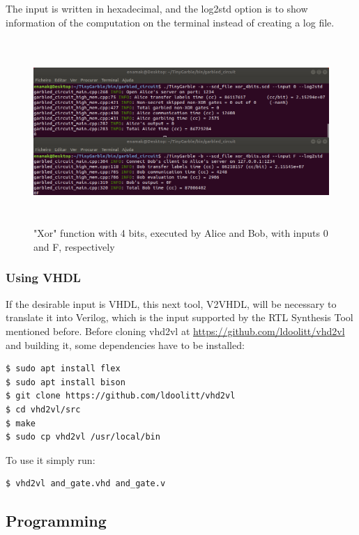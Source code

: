 \begin{refsection}
The input is written in hexadecimal, and the log2std option is to show information of the computation on the terminal instead of creating a log file.

\begin{figure}[H]
	\centering
	\includegraphics[width=1\textwidth, height=7cm]{./sdf/tiny_garble/figures/tinygarble_xor_4bits_b.png}
    \caption{"Xor" function with 4 bits, executed by Alice and Bob, with inputs 0 and F, respectively}\label{fig:tinygarble_xor_b}
\end{figure}

\subsubsection{Using VHDL}

If the desirable input is VHDL, this next tool, V2VHDL, will be necessary to translate it into Verilog, which is the input supported by the RTL Synthesis Tool mentioned before.
Before cloning vhd2vl at \url{https://github.com/ldoolitt/vhd2vl} and building it, some dependencies have to be installed:

\begin{lstlisting}[caption={Installation of VHD2VL}, language=bash, captionpos=b]
$ sudo apt install flex
$ sudo apt install bison
$ git clone https://github.com/ldoolitt/vhd2vl
$ cd vhd2vl/src
$ make
$ sudo cp vhd2vl /usr/local/bin
\end{lstlisting}

To use it simply run:

\begin{lstlisting}[caption={Translation of VHDL file into Verilog}, language=bash, captionpos=b]
$ vhd2vl and_gate.vhd and_gate.v	
\end{lstlisting}

\newpage

\subsection{Programming}


\end{refsection}
